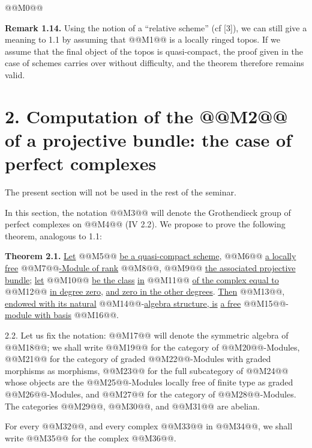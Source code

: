 @@M0@@

\textbf{Remark 1.14.} Using the notion of a ``relative scheme'' (cf [3]), we can still give a meaning to 1.1 by assuming that @@M1@@ is a locally ringed topos. If we assume that the final object of the topos is quasi-compact, the proof given in the case of schemes carries over without difficulty, and the theorem therefore remains valid.

\section*{2. Computation of the @@M2@@ of a projective bundle: the case of perfect complexes}

The present section will not be used in the rest of the seminar.

In this section, the notation @@M3@@ will denote the Grothendieck group of perfect complexes on @@M4@@ (IV 2.2). We propose to prove the following theorem, analogous to 1.1:

\textbf{Theorem 2.1.} \uline{Let} @@M5@@ \uline{be a quasi-compact scheme}, @@M6@@ \uline{a locally free} @@M7@@\uline{-Module of rank} @@M8@@, @@M9@@ \uline{the associated projective bundle}; \uline{let} @@M10@@ \uline{be the class} \uline{in} @@M11@@ \uline{of the complex equal to} @@M12@@ \uline{in degree zero}, \uline{and zero in the other degrees}. \uline{Then} @@M13@@, \uline{endowed with its natural} @@M14@@-\uline{algebra structure, is} \uline{a free} @@M15@@-\uline{module with basis} @@M16@@.

2.2. Let us fix the notation: @@M17@@ will denote the symmetric algebra of @@M18@@; we shall write @@M19@@ for the category of @@M20@@-Modules, @@M21@@ for the category of graded @@M22@@-Modules with graded morphisms as morphisms, @@M23@@ for the full subcategory of @@M24@@ whose objects are the @@M25@@-Modules locally free of finite type as graded @@M26@@-Modules, and @@M27@@ for the category of @@M28@@-Modules. The categories @@M29@@, @@M30@@, and @@M31@@ are abelian.

For every @@M32@@, and every complex @@M33@@ in @@M34@@, we shall write @@M35@@ for the complex @@M36@@.

